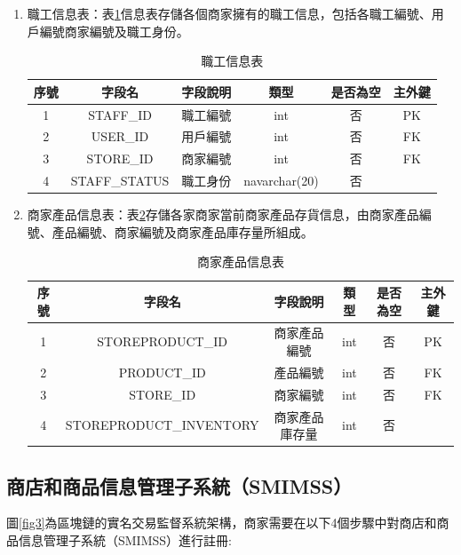 \begin{enumerate}
		\item 職工信息表：表\ref{staff}信息表存儲各個商家擁有的職工信息，包括各職工編號、用戶編號商家編號及職工身份。
				\begin{table}[!htbp]
				\centering
				\caption{職工信息表}
				\label{staff}
				\begin{tabular}{|c|c|c|c|c|c|}
				\hline
				序號 & 字段名 & 字段說明 & 類型 & 是否為空 & 主外鍵 \\ \hline
				1 & STAFF\_ID & 職工編號 & int & 否 & PK \\ \hline
				2 & USER\_ID & 用戶編號 & int & 否 & FK \\ \hline
				3 & STORE\_ID & 商家編號 & int & 否 & FK \\ \hline
				4 & STAFF\_STATUS & 職工身份 & navarchar(20) & 否 &  \\ \hline
				\end{tabular}
				\end{table}

		\item 商家產品信息表：表\ref{storeproduct}存儲各家商家當前商家產品存貨信息，由商家產品編號、產品編號、商家編號及商家產品庫存量所組成。
				\begin{table}[!htbp]
				\centering
				\caption{商家產品信息表}
				\label{storeproduct}
				\begin{tabular}{|c|c|c|c|c|c|}
				\hline
				序號 & 字段名 & 字段說明 & 類型 & 是否為空 & 主外鍵 \\ \hline
				1 & STOREPRODUCT\_ID & 商家產品編號 & int & 否 & PK \\ \hline
				2 & PRODUCT\_ID & 產品編號 & int & 否 & FK \\ \hline
				3 & STORE\_ID & 商家編號 & int & 否 & FK \\ \hline
				4 & STOREPRODUCT\_INVENTORY & 商家產品庫存量 & int & 否 &  \\ \hline
				\end{tabular}
				\end{table}

	\end{enumerate}

	\subsection{商店和商品信息管理子系統（SMIMSS）}
	圖\ref{fig3}為區塊鏈的實名交易監督系統架構，商家需要在以下4個步驟中對商店和商品信息管理子系統（SMIMSS）進行註冊:

